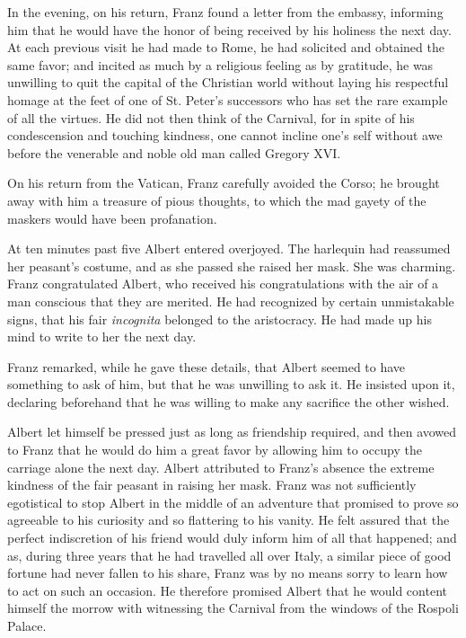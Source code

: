 In the evening, on his return, Franz found a letter from the embassy,
informing him that he would have the honor of being received by his
holiness the next day. At each previous visit he had made to Rome, he
had solicited and obtained the same favor; and incited as much by a
religious feeling as by gratitude, he was unwilling to quit the capital
of the Christian world without laying his respectful homage at the feet
of one of St. Peter’s successors who has set the rare example of all
the virtues. He did not then think of the Carnival, for in spite of his
condescension and touching kindness, one cannot incline one’s self
without awe before the venerable and noble old man called Gregory XVI.

On his return from the Vatican, Franz carefully avoided the Corso; he
brought away with him a treasure of pious thoughts, to which the mad
gayety of the maskers would have been profanation.

At ten minutes past five Albert entered overjoyed. The harlequin had
reassumed her peasant’s costume, and as she passed she raised her mask.
She was charming. Franz congratulated Albert, who received his
congratulations with the air of a man conscious that they are merited.
He had recognized by certain unmistakable signs, that his fair
\textit{incognita} belonged to the aristocracy. He had made up his mind to
write to her the next day.

Franz remarked, while he gave these details, that Albert seemed to have
something to ask of him, but that he was unwilling to ask it. He
insisted upon it, declaring beforehand that he was willing to make any
sacrifice the other wished.

Albert let himself be pressed just as long as friendship required, and
then avowed to Franz that he would do him a great favor by allowing him
to occupy the carriage alone the next day. Albert attributed to Franz’s
absence the extreme kindness of the fair peasant in raising her mask.
Franz was not sufficiently egotistical to stop Albert in the middle of
an adventure that promised to prove so agreeable to his curiosity and
so flattering to his vanity. He felt assured that the perfect
indiscretion of his friend would duly inform him of all that happened;
and as, during three years that he had travelled all over Italy, a
similar piece of good fortune had never fallen to his share, Franz was
by no means sorry to learn how to act on such an occasion. He therefore
promised Albert that he would content himself the morrow with
witnessing the Carnival from the windows of the Rospoli Palace.

